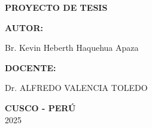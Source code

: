 \begin{center}
\fontsize{14pt}{11pt}\selectfont\bfseries{PROYECTO DE TESIS} 
\end{center}


\hspace{8cm} \textbf{AUTOR:} \nolinebreak
\vspace{-0.3cm}

\hspace{8cm} Br. Kevin Heberth Haquehua Apaza


\hspace{8cm} \textbf{DOCENTE:} \nolinebreak
\vspace{-0.3cm}

\hspace{8cm} Dr. ALFREDO VALENCIA TOLEDO
\vspace{-0.3cm}





\vspace{0.3cm}						

\begin{center}
\Large \textbf{CUSCO - PERÚ} \\  2025
\end{center}

\clearpage
